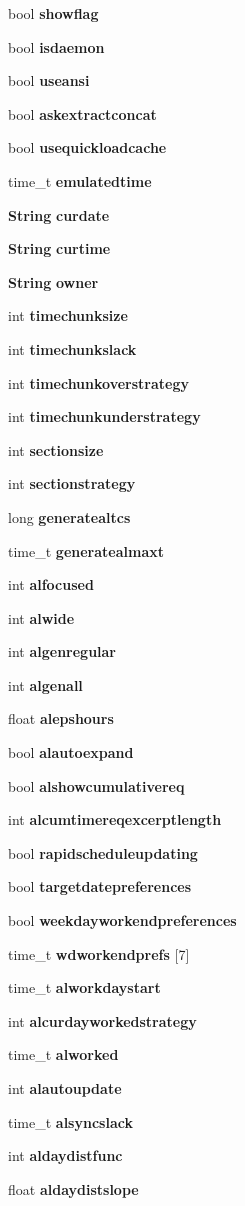 \begin{CompactItemize}
bool {\bf showflag}
\item 
bool {\bf isdaemon}
\item 
bool {\bf useansi}
\item 
bool {\bf askextractconcat}
\item 
bool {\bf usequickloadcache}
\item 
time\_\-t {\bf emulatedtime}
\item 
{\bf String} {\bf curdate}
\item 
{\bf String} {\bf curtime}
\item 
{\bf String} {\bf owner}
\item 
int {\bf timechunksize}
\item 
int {\bf timechunkslack}
\item 
int {\bf timechunkoverstrategy}
\item 
int {\bf timechunkunderstrategy}
\item 
int {\bf sectionsize}
\item 
int {\bf sectionstrategy}
\item 
long {\bf generatealtcs}
\item 
time\_\-t {\bf generatealmaxt}
\item 
int {\bf alfocused}
\item 
int {\bf alwide}
\item 
int {\bf algenregular}
\item 
int {\bf algenall}
\item 
float {\bf alepshours}
\item 
bool {\bf alautoexpand}
\item 
bool {\bf alshowcumulativereq}
\item 
int {\bf alcumtimereqexcerptlength}
\item 
bool {\bf rapidscheduleupdating}
\item 
bool {\bf targetdatepreferences}
\item 
bool {\bf weekdayworkendpreferences}
\item 
time\_\-t {\bf wdworkendprefs} [7]
\item 
time\_\-t {\bf alworkdaystart}
\item 
int {\bf alcurdayworkedstrategy}
\item 
time\_\-t {\bf alworked}
\item 
int {\bf alautoupdate}
\item 
time\_\-t {\bf alsyncslack}
\item 
int {\bf aldaydistfunc}
\item 
float {\bf aldaydistslope}

\end{CompactItemize}
